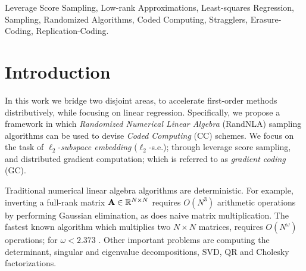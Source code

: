 \documentclass[journal,letterpaper,onecolumn,twoside,nofonttune]{IEEEtran}
\newcommand{\R}{\mathbb{R}}
\newcommand{\Ab}{\bold{A}}
\newcommand{\SVD}{\mathrm{SVD}}
\newcommand{\QR}{\mathrm{QR}}
\begin{document}
\begin{IEEEkeywords}
Leverage Score Sampling, Low-rank Approximations, Least-squares Regression, Sampling, Randomized Algorithms, Coded Computing, Stragglers, Erasure-Coding, Replication-Coding.
\end{IEEEkeywords}

\section{Introduction}

In this work we bridge two disjoint areas, to accelerate first-order methods distributively, while focusing on linear regression. Specifically, we propose a framework in which \textit{Randomized Numerical Linear Algebra} (RandNLA) sampling algorithms can be used to devise \textit{Coded Computing} (CC) schemes. We focus on the task of $\ell_2$-\textit{subspace embedding} ($\ell_2$-s.e.); through leverage score sampling, and distributed gradient computation; which is referred to as \textit{gradient coding} (GC).

Traditional numerical linear algebra algorithms are deterministic. For example, inverting a full-rank matrix $\Ab\in\R^{N\times N}$ requires $O(N^3)$ arithmetic operations by performing Gaussian elimination, as does naive matrix multiplication. The fastest known algorithm which multiplies two $N\times N$ matrices, requires $O(N^{\omega})$ operations; for $\omega<2.373$ \cite{AV21,PV20}. Other important problems are computing the determinant, singular and eigenvalue decompositions, $\SVD$, $\QR$ and Cholesky factorizations.%
\end{document}
